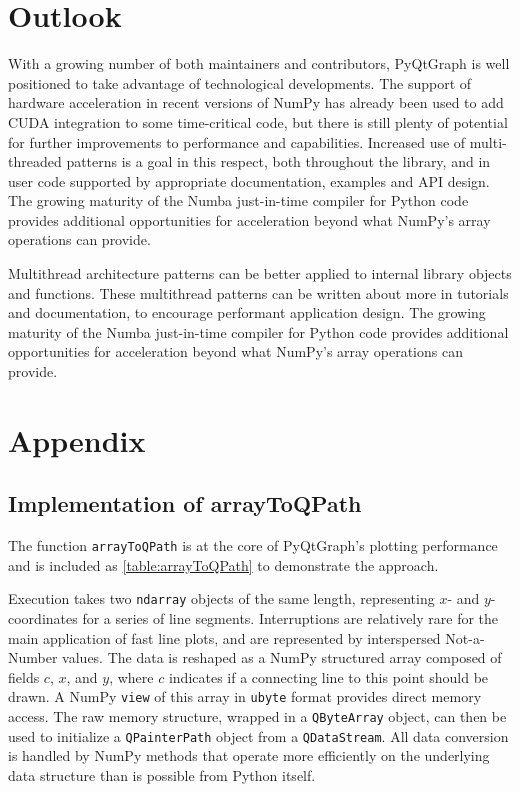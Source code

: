 \documentclass[journal]{vgtc}                %
\begin{document}
\section{Outlook}
With a growing number of both maintainers and contributors, PyQtGraph is well positioned to take advantage of technological developments. The support of hardware acceleration in recent versions of NumPy has already been used to add CUDA integration to some time-critical code, but there is still plenty of potential for further improvements to performance and capabilities. \color{DarkOrchid} Increased use of multi-threaded patterns is a goal in this respect, both throughout the library, and in user code supported by appropriate documentation, examples and API design. The growing maturity of the Numba just-in-time compiler \cite{lam2015numba} for Python code provides additional opportunities for acceleration beyond what NumPy's array operations can provide.

\color{brown}
Multithread architecture patterns can be better applied to internal library objects and functions. These multithread patterns can be written about more in tutorials and documentation, to encourage performant application design. The growing maturity of the Numba just-in-time compiler \cite{lam2015numba} for Python code provides additional opportunities for acceleration beyond what NumPy's array operations can provide.

\color{DarkOrchid}
\color{black}

\section{Appendix}

\subsection{Implementation of arrayToQPath}
\label{app_arrayToQPath}
The function \texttt{arrayToQPath} is at the core of PyQtGraph's plotting performance and is included as \autoref{table:arrayToQPath} to demonstrate the approach.

Execution takes two \texttt{ndarray} objects of the same length, representing $x$- and $y$-coordinates for a series of line segments. Interruptions are relatively rare for the main application of fast line plots, and are represented by interspersed Not-a-Number values. The data is reshaped as a NumPy structured array composed of fields $c$, $x$, and $y$, where $c$ indicates if a connecting line to this point should be drawn. A NumPy \texttt{view} of this array in \texttt{ubyte} format provides direct memory access. The raw memory structure, wrapped in a \texttt{QByteArray} object, can then be used to initialize a \texttt{QPainterPath} object from a \texttt{QDataStream}. All data conversion is handled by NumPy methods that operate more efficiently on the underlying data structure than is possible from Python itself.
\end{document}
